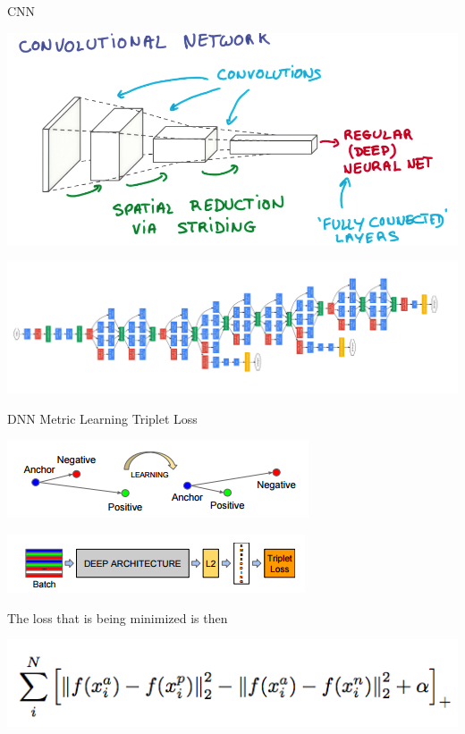 \documentclass{beamer}
\begin{document}
\begin{frame}{CNN}
	 \begin{center}
	 	
	 	\includegraphics[scale=0.25]{img/cnn}
	 	
	 	
	 	\includegraphics[scale=0.4]{img/gn}
	 \end{center}
\end{frame}

\begin{frame}{DNN Metric Learning Triplet Loss}
	
			 \begin{center}
			 	\includegraphics[scale=0.7]{img/ns}
			 \end{center}
	
		 \begin{center}
		 	\includegraphics[scale=0.7]{img/tl2}
		 \end{center}
 The loss that is being minimized is then 
	 \begin{center}
	 	 \includegraphics[scale=0.4]{img/tl}
	 \end{center}
\end{frame}
\end{document}
